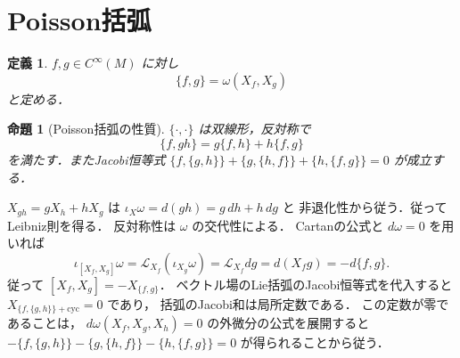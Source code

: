\documentclass[a5paper,10pt,onecolumn]{jsarticle}
\makeatletter
\theoremstyle{mathnotetheorem}
\newtheorem{definition}[theorem]{定義}
\newtheorem{proposition}[theorem]{命題}
\renewcommand{\proofname}{証明}
\renewenvironment{proof}[1][\proofname]{%
  \par\pushQED{\qed}\normalfont\topsep4\p@\@plus2\p@\relax
  \trivlist\item[\hskip\labelsep\bfseries #1]\ignorespaces
}{\popQED\endtrivlist\@endpefalse}
\makeatother
\begin{document}
\section{Poisson括弧}
\begin{definition}
$f,g\in C^\infty(M)$ に対し
\[
 \{f,g\}=\omega(X_f,X_g)
\]
と定める．
\end{definition}
\begin{proposition}[Poisson括弧の性質]\label{prop:poisson}
$\{\cdot,\cdot\}$ は双線形，反対称で
\[
 \{f,gh\}=g\{f,h\}+h\{f,g\}
\]
を満たす．またJacobi恒等式
$\{f,\{g,h\}\}+\{g,\{h,f\}\}+\{h,\{f,g\}\}=0$
が成立する．
\end{proposition}
\begin{proof}
$X_{gh}=gX_h+hX_g$ は
$\iota_X\omega=d(gh)=g\,dh+h\,dg$ と
非退化性から従う．従ってLeibniz則を得る．
反対称性は $\omega$ の交代性による．
Cartanの公式と $d\omega=0$ を用いれば
\[
 \iota_{[X_f,X_g]}\omega
 =\mathcal L_{X_f}(\iota_{X_g}\omega)
 =\mathcal L_{X_f}dg
 =d(X_f g)=-d\{f,g\}.
\]
従って $[X_f,X_g]=-X_{\{f,g\}}$．
ベクトル場のLie括弧のJacobi恒等式を代入すると
$X_{\{f,\{g,h\}\}+\mathrm{cyc}}=0$ であり，
括弧のJacobi和は局所定数である．
この定数が零であることは，
$d\omega(X_f,X_g,X_h)=0$ の外微分の公式を展開すると
$-\{f,\{g,h\}\}-\{g,\{h,f\}\}-\{h,\{f,g\}\}=0$
が得られることから従う．
\end{proof}
\end{document}
